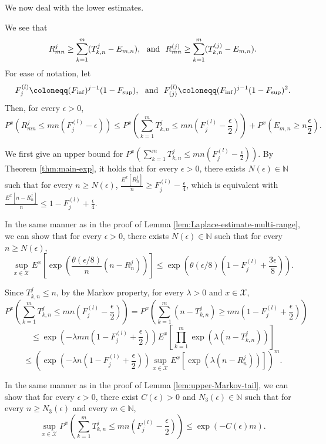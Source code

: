 \documentclass[a4paper, reqno, 11pt]{amsart}
\theoremstyle{definition}
\begin{document}
We now deal with the lower estimates. 

We see that 
\[ R_{mn}^{j} \ge \sum_{k=1}^{m}  (T^{j}_{k,n} - E_{m,n}), \ \textup{ and }  \  R_{mn}^{(j)} \ge \sum_{k=1}^{m} (T^{(j)}_{k,n} - E_{m,n}). \]
For ease of notation, let 
\[ F^{(l)}_{j} \coloneqq (F_{\inf})^{j-1} (1-F_{\sup}), \ \textup{ and }  \ F^{(l)}_{(j)} \coloneqq (F_{\inf})^{j-1} (1-F_{\sup})^2. \]
Then, for every $\epsilon > 0$, 
\[ P^x \left(R_{mn}^{j} \le mn(F_j^{(l)} - \epsilon)\right) \le P^x \left(  \sum_{k=1}^{m}   T^{j}_{k,n} \le mn \left(F_j^{(l)} - \frac{\epsilon}{2} \right) \right) + P^x \left(  E_{m,n} \ge n \frac{\epsilon}{2} \right). \]


We first give an upper bound for  $\displaystyle P^x \left(  \sum_{k=1}^{m}   T^{j}_{k,n} \le mn \left(F_j^{(l)} - \frac{\epsilon}{2} \right) \right)$. 
By Theorem \ref{thm:main-exp}, 
it holds that 
for every $\epsilon > 0$, 
there exists $N(\epsilon) \in \mathbb{N}$ such that 
for every $n \ge N(\epsilon)$, 
$\displaystyle \frac{E^x \left[R_n^j \right] }{n} \ge F_j^{(l)} - \frac{\epsilon}{4}$, which is equivalent with $\displaystyle \frac{E^x \left[n - R_n^j \right] }{n} \le 1 - F_j^{(l)} + \frac{\epsilon}{4}$. 

In the same manner as in the proof of Lemma \ref{lem:Laplace-estimate-multi-range}, 
we can show that 
for every $\epsilon > 0$, there exists  $N(\epsilon) \in \mathbb{N}$ such that 
for every $n \ge N(\epsilon)$, 
\[ \sup_{x \in \mathcal{X}} E^x \left[\exp\left(\frac{\theta(\epsilon/8)}{n} (n-R_n^j) \right) \right] \le \exp\left(\theta(\epsilon/8) \left(1 - F_j^{(l)} + \frac{3\epsilon}{8} \right) \right).\] 


Since $T^{j}_{k,n} \le n$, 
by the Markov property, for every $\lambda > 0$ and $x \in \mathcal{X}$, 
\[  P^x \left(  \sum_{k=1}^{m}   T^{j}_{k,n} \le mn \left(F_j^{(l)} - \frac{\epsilon}{2} \right) \right) = P^x \left(  \sum_{k=1}^{m}   (n-T^{j}_{k,n}) \ge mn \left(1 - F_j^{(l)} + \frac{\epsilon}{2} \right) \right)\]
\[ \le \exp\left(-\lambda mn \left(1 - F_j^{(l)} + \frac{\epsilon}{2} \right) \right) E^x \left[ \prod_{k=1}^{m} \exp\left( \lambda (n-T^{j}_{k,n})  \right)  \right] \]
\[ \le \left( \exp\left(-\lambda n \left(1 - F_j^{(l)} + \frac{\epsilon}{2} \right) \right) \sup_{x \in \mathcal{X}} E^x \left[ \exp\left(\lambda (n-R^j_n) \right) \right] \right)^m. \]

In the same manner as in the proof of Lemma \ref{lem:upper-Markov-tail}, 
we can show that 
for every $\epsilon > 0$, there exist $C(\epsilon) > 0$  and $N_3 (\epsilon) \in \mathbb{N}$ such that 
for every $n \ge N_3 (\epsilon)$ and every $m \in \mathbb{N}$, 
\begin{equation*}
\sup_{x \in \mathcal{X}} P^x \left(  \sum_{k=1}^{m}   T^{j}_{k,n} \le mn \left(F_j^{(l)} - \frac{\epsilon}{2} \right) \right)  \le \exp\left(-C(\epsilon) m \right). 
\end{equation*}
\end{document}
